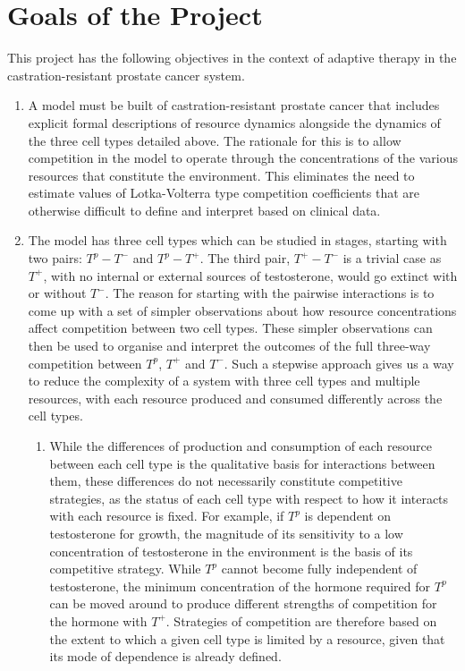 \section{Goals of the Project}
This project has the following objectives in the context of adaptive therapy in the castration-resistant prostate cancer system.
\begin{enumerate}
  \item A model must be built of castration-resistant prostate cancer that includes explicit formal descriptions of resource dynamics alongside the dynamics of the three cell types detailed above. The rationale for this is to allow competition in the model to operate through the concentrations of the various resources that constitute the environment. This eliminates the need to estimate values of Lotka-Volterra type competition coefficients that are otherwise difficult to define and interpret based on clinical data.
  \item The model has three cell types which can be studied in stages, starting with two pairs: $T^p-T^-$ and $T^p-T^+$. The third pair, $T^+-T^-$ is a trivial case as $T^+$, with no internal or external sources of testosterone, would go extinct with or without $T^-$. The reason for starting with the pairwise interactions is to come up with a set of simpler observations about how resource concentrations affect competition between two cell types. These simpler observations can then be used to organise and interpret the outcomes of the full three-way competition between $T^p$, $T^+$ and $T^-$. Such a stepwise approach gives us a way to reduce the complexity of a system with three cell types and multiple resources, with each resource produced and consumed differently across the cell types.
  \begin{enumerate}
    \item While the differences of production and consumption of each resource between each cell type is the qualitative basis for interactions between them, these differences do not necessarily constitute competitive strategies, as the status of each cell type with respect to how it interacts with each resource is fixed. For example, if $T^p$ is dependent on testosterone for growth, the magnitude of its sensitivity to a low concentration of testosterone in the environment is the basis of its competitive strategy. While $T^p$ cannot become fully independent of testosterone, the minimum concentration of the hormone required for $T^p$ can be moved around to produce different strengths of competition for the hormone with $T^+$. Strategies of competition are therefore based on the extent to which a given cell type is limited by a resource, given that its mode of dependence is already defined.

\end{enumerate}
\end{enumerate}
